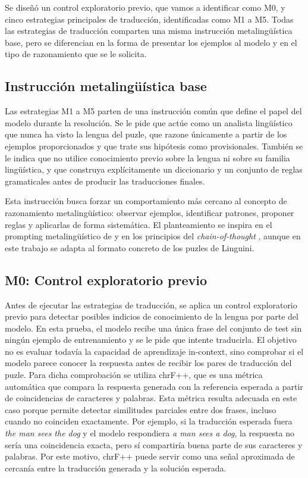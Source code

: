 Se diseñó un control exploratorio previo, que vamos a identificar como M0, y cinco estrategias principales de traducción, identificadas como M1 a M5. Todas las estrategias de traducción comparten una misma instrucción metalingüística base, pero se diferencian en la forma de presentar los ejemplos al modelo y en el tipo de razonamiento que se le solicita.

\subsection{Instrucción metalingüística base}

Las estrategias M1 a M5 parten de una instrucción común que define el papel del modelo durante la resolución. Se le pide que actúe como un analista lingüístico que nunca ha visto la lengua del puzle, que razone únicamente a partir de los ejemplos proporcionados y que trate sus hipótesis como provisionales. También se le indica que no utilice conocimiento previo sobre la lengua ni sobre su familia lingüística, y que construya explícitamente un diccionario y un conjunto de reglas gramaticales antes de producir las traducciones finales.

Esta instrucción busca forzar un comportamiento más cercano al concepto de razonamiento metalingüístico: observar ejemplos, identificar patrones, proponer reglas y aplicarlas de forma sistemática. El planteamiento se inspira en el prompting metalingüístico de \citet{zhu2025evaluating} y en los principios del \textit{chain-of-thought} \citep{wei2022chain}, aunque en este trabajo se adapta al formato concreto de los puzles de Linguini.

\subsection{M0: Control exploratorio previo}
\label{subsec:m0}

Antes de ejecutar las estrategias de traducción, se aplica un control exploratorio previo para detectar posibles indicios de conocimiento de la lengua por parte del modelo. En esta prueba, el modelo recibe una única frase del conjunto de test sin ningún ejemplo de entrenamiento y se le pide que intente traducirla. El objetivo no es evaluar todavía la capacidad de aprendizaje in-context, sino comprobar si el modelo parece conocer la respuesta antes de recibir los pares de traducción del puzle. Para dicha comprobación se utiliza chrF++, que es una métrica automática que compara la respuesta generada con la referencia esperada a partir de coincidencias de caracteres y palabras. Esta métrica resulta adecuada en este caso porque permite detectar similitudes parciales entre dos frases, incluso cuando no coinciden exactamente. Por ejemplo, si la traducción esperada fuera \textit{the man sees the dog} y el modelo respondiera \textit{a man sees a dog}, la respuesta no sería una coincidencia exacta, pero sí compartiría buena parte de sus caracteres y palabras. Por este motivo, chrF++ puede servir como una señal aproximada de cercanía entre la traducción generada y la solución esperada.


